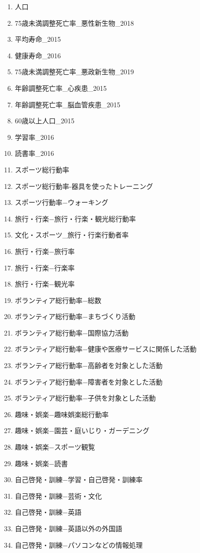 \begin{enumerate}
  \item 人口
  \item 75歳未満調整死亡率\_悪性新生物\_2018
  \item 平均寿命\_2015
  \item 健康寿命\_2016
  \item 75歳未満調整死亡率\_悪政新生物\_2019
  \item 年齢調整死亡率\_心疾患\_2015
  \item 年齢調整死亡率\_脳血管疾患\_2015
  \item 60歳以上人口\_2015
  \item 学習率\_2016
  \item 読書率\_2016
  \item スポーツ総行動率
  \item スポーツ総行動率-器具を使ったトレーニング
  \item スポーツ行動率−ウォーキング
  \item 旅行・行楽−旅行・行楽・観光総行動率
  \item 文化・スポーツ\_旅行・行楽行動者率
  \item 旅行・行楽−旅行率
  \item 旅行・行楽−行楽率
  \item 旅行・行楽−観光率
  \item ボランティア総行動率−総数
  \item ボランティア総行動率−まちづくり活動
  \item ボランティア総行動率−国際協力活動
  \item ボランティア総行動率−健康や医療サービスに関係した活動
  \item ボランティア総行動率−高齢者を対象とした活動
  \item ボランティア総行動率−障害者を対象とした活動
  \item ボランティア総行動率−子供を対象とした活動
  \item 趣味・娯楽−趣味娯楽総行動率
  \item 趣味・娯楽−園芸・庭いじり・ガーデニング
  \item 趣味・娯楽−スポーツ観覧
  \item 趣味・娯楽−読書
  \item 自己啓発・訓練−学習・自己啓発・訓練率
  \item 自己啓発・訓練−芸術・文化
  \item 自己啓発・訓練−英語
  \item 自己啓発・訓練−英語以外の外国語
  \item 自己啓発・訓練−パソコンなどの情報処理

\end{enumerate}

